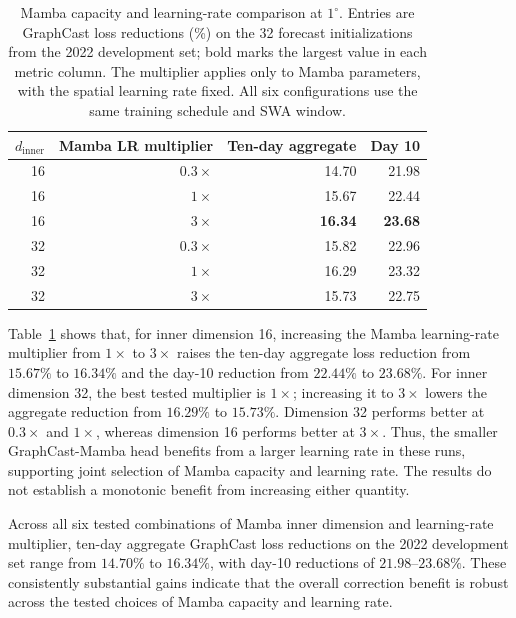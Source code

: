 \documentclass[11pt]{article}
\begin{document}
\begin{table}[!htbp]
    \centering
    \caption{{Mamba capacity and learning-rate comparison at $1^\circ$. Entries are {GraphCast loss} reductions (\%) on the 32 forecast initializations from the 2022 development set; bold marks the largest value in each metric column. The multiplier applies only to Mamba parameters, with the spatial learning rate fixed. All six configurations use the same training schedule and SWA window.}}
    \label{tab:lr_sensitivity}
    \small
    \begin{tabular}{rrrr}
        \toprule
        $d_{\mathrm{inner}}$ & Mamba LR multiplier & Ten-day aggregate & Day 10 \\
        \midrule
        16 & $0.3\times$ & 14.70 & 21.98 \\
        16 & $1\times$   & 15.67 & 22.44 \\
        16 & $3\times$   & \textbf{16.34} & \textbf{23.68} \\
        32 & $0.3\times$ & 15.82 & 22.96 \\
        32 & $1\times$   & 16.29 & 23.32 \\
        32 & $3\times$   & 15.73 & 22.75 \\
        \bottomrule
    \end{tabular}
\end{table}

\begin{samepage}
Table~\ref{tab:lr_sensitivity} shows that, for inner dimension 16, increasing the Mamba learning-rate multiplier from $1\times$ to $3\times$ raises the ten-day aggregate loss reduction from $15.67\%$ to $16.34\%$ and the day-10 reduction from $22.44\%$ to $23.68\%$. For inner dimension 32, the best tested multiplier is $1\times$; increasing it to $3\times$ lowers the aggregate reduction from $16.29\%$ to $15.73\%$. Dimension 32 performs better at $0.3\times$ and $1\times$, whereas dimension 16 performs better at $3\times$. Thus, the smaller GraphCast-Mamba head benefits from a larger learning rate in these runs, supporting joint selection of Mamba capacity and learning rate. The results do not establish a monotonic benefit from increasing either quantity.\par
\end{samepage}

Across all six tested combinations of Mamba inner dimension and learning-rate multiplier, ten-day aggregate GraphCast loss reductions on the 2022 development set range from $14.70\%$ to $16.34\%$, with day-10 reductions of $21.98$--$23.68\%$. These consistently substantial gains indicate that the overall correction benefit is robust across the tested choices of Mamba capacity and learning rate.
\end{document}

